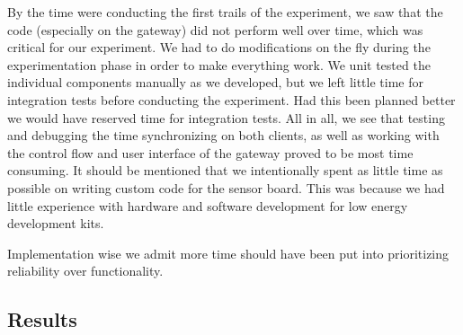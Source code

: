 By the time were conducting the first trails of the experiment, we saw that the code (especially on the gateway) did not perform well over time, which was critical for our experiment. We had to do modifications on the fly during the experimentation phase in order to make everything work. We unit tested the individual components manually as we developed, but we left little time for integration tests before conducting the experiment. Had this been planned better we would have reserved time for integration tests. All in all, we see that testing and debugging the time synchronizing on both clients, as well as working with the control flow and user interface of the gateway proved to be most time consuming. It should be mentioned that we intentionally spent as little time as possible on writing custom code for the sensor board. This was because we had little experience with hardware and software development for low energy development kits. 

Implementation wise we admit more time should have been put into prioritizing reliability over functionality.


\subsection{Results} %
\label{sub:results}


